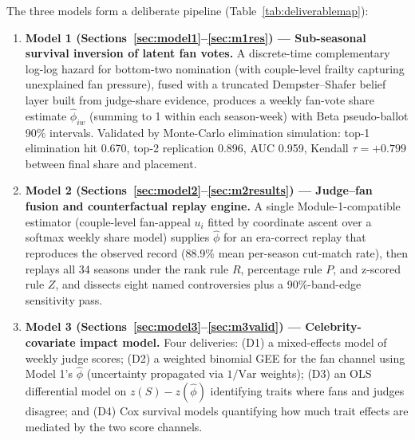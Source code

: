 \documentclass[10pt]{article}
\begin{document}
The three models form a deliberate pipeline (Table~\ref{tab:deliverablemap}):

\begin{enumerate}[itemsep=2pt]
\item \textbf{Model 1 (Sections~\ref{sec:model1}--\ref{sec:m1res}) --- Sub-seasonal
survival inversion of latent fan votes.} A discrete-time complementary log-log hazard for
bottom-two nomination (with couple-level frailty capturing unexplained fan pressure),
fused with a truncated Dempster--Shafer belief layer built from judge-share evidence,
produces a weekly fan-vote share estimate $\hat\phi_{iw}$ (summing to 1 within each
season-week) with Beta pseudo-ballot 90\% intervals. Validated by Monte-Carlo elimination
simulation: top-1 elimination hit 0.670, top-2 replication 0.896, AUC 0.959, Kendall
$\tau = +0.799$ between final share and placement.
\item \textbf{Model 2 (Sections~\ref{sec:model2}--\ref{sec:m2results}) --- Judge--fan
fusion and counterfactual replay engine.} A single Module-1-compatible estimator
(couple-level fan-appeal $u_i$ fitted by coordinate ascent over a softmax weekly share
model) supplies $\hat\phi$ for an era-correct replay that reproduces the observed record
(88.9\% mean per-season cut-match rate), then replays all 34 seasons under the rank rule
$R$, percentage rule $P$, and z-scored rule $Z$, and dissects eight named controversies
plus a 90\%-band-edge sensitivity pass.
\item \textbf{Model 3 (Sections~\ref{sec:model3}--\ref{sec:m3valid}) --- Celebrity-covariate
impact model.} Four deliveries: (D1) a mixed-effects model of weekly judge scores;
(D2) a weighted binomial GEE for the fan channel using Model 1's $\hat\phi$ (uncertainty
propagated via $1/\mathrm{Var}$ weights); (D3) an OLS differential model on
$z(S) - z(\hat\phi)$ identifying traits where fans and judges disagree; and (D4) Cox
survival models quantifying how much trait effects are mediated by the two score channels.
\end{enumerate}
\end{document}
